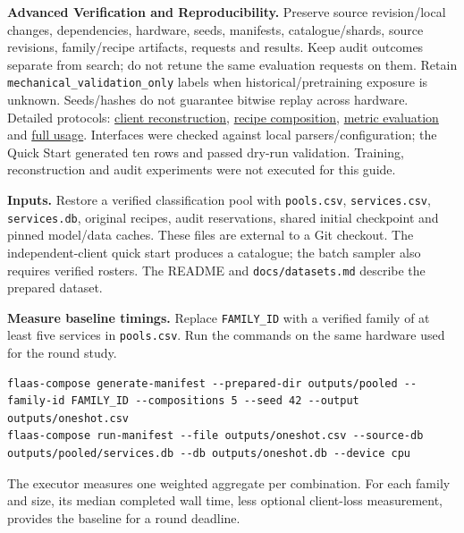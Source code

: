 \documentclass[10pt,a4paper]{article}
\makeatletter
\newcommand{\code}[1]{\nolinkurl{#1}}
\newcommand{\lead}[1]{\par\smallskip\noindent\textbf{#1}\enspace}
\renewcommand\section{\@startsection{section}{1}{0pt}{-1.8ex plus -.2ex}{.7ex}{\normalfont\large\bfseries\color{ink}}}
\makeatother
\begin{document}
\textbf{Advanced Verification and Reproducibility.} Preserve source revision/local changes, dependencies, hardware, seeds, manifests, catalogue/shards, source revisions, family/recipe artifacts, requests and results. Keep audit outcomes separate from search; do not retune the same evaluation requests on them. Retain \code{mechanical_validation_only} labels when historical/pretraining exposure is unknown. Seeds/hashes do not guarantee bitwise replay across hardware. Detailed protocols: \href{../../docs/client-reconstruction.md}{client reconstruction}, \href{../../docs/recipe-composition.md}{recipe composition}, \href{../../docs/metric-evaluation-protocol.md}{metric evaluation} and \href{../../docs/usage.md}{full usage}. Interfaces were checked against local parsers/configuration; the Quick Start generated ten rows and passed dry-run validation. Training, reconstruction and audit experiments were not executed for this guide.

\newpage
\section{Execute local federated rounds}
\textbf{Inputs.} Restore a verified classification pool with \code{pools.csv}, \code{services.csv}, \code{services.db}, original recipes, audit reservations, shared initial checkpoint and pinned model/data caches. These files are external to a Git checkout. The independent-client quick start produces a catalogue; the batch sampler also requires verified rosters. The README and \code{docs/datasets.md} describe the prepared dataset.

\lead{Measure baseline timings.} Replace \code{FAMILY_ID} with a verified family of at least five services in \code{pools.csv}. Run the commands on the same hardware used for the round study.
\begin{lstlisting}
flaas-compose generate-manifest --prepared-dir outputs/pooled --family-id FAMILY_ID --compositions 5 --seed 42 --output outputs/oneshot.csv
flaas-compose run-manifest --file outputs/oneshot.csv --source-db outputs/pooled/services.db --db outputs/oneshot.db --device cpu
\end{lstlisting}
The executor measures one weighted aggregate per combination. For each family and size, its median completed wall time, less optional client-loss measurement, provides the baseline for a round deadline.
\end{document}
